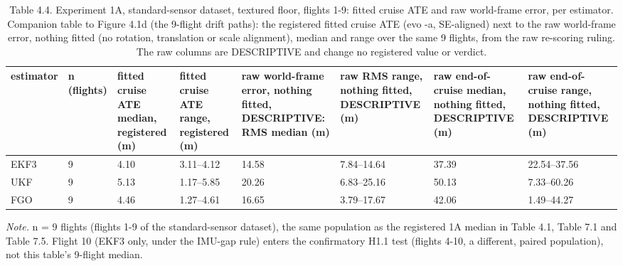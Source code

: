 \begin{table}[htbp]
\centering
\footnotesize
\caption{Table 4.4. Experiment 1A, standard-sensor dataset, textured floor, flights 1-9: fitted cruise ATE and raw world-frame error, per estimator. Companion table to Figure 4.1d (the 9-flight drift paths): the registered fitted cruise ATE (evo -a, SE-aligned) next to the raw world-frame error, nothing fitted (no rotation, translation or scale alignment), median and range over the same 9 flights, from the raw re-scoring ruling. The raw columns are DESCRIPTIVE and change no registered value or verdict.}
\label{tab:4-4}
\begin{tabular}{p{}p{}p{}p{}p{}p{}p{}p{}}
\toprule
\textbf{estimator} & \textbf{n (flights)} & \textbf{fitted cruise ATE median, registered (m)} & \textbf{fitted cruise ATE range, registered (m)} & \textbf{raw world-frame error, nothing fitted, DESCRIPTIVE: RMS median (m)} & \textbf{raw RMS range, nothing fitted, DESCRIPTIVE (m)} & \textbf{raw end-of-cruise median, nothing fitted, DESCRIPTIVE (m)} & \textbf{raw end-of-cruise range, nothing fitted, DESCRIPTIVE (m)} \\
\midrule
EKF3 & 9 & 4.10 & 3.11--4.12 & 14.58 & 7.84--14.64 & 37.39 & 22.54--37.56 \\
UKF & 9 & 5.13 & 1.17--5.85 & 20.26 & 6.83--25.16 & 50.13 & 7.33--60.26 \\
FGO & 9 & 4.46 & 1.27--4.61 & 16.65 & 3.79--17.67 & 42.06 & 1.49--44.27 \\
\bottomrule
\end{tabular}
\par\smallskip\raggedright
\textit{Note.} n = 9 flights (flights 1-9 of the standard-sensor dataset), the same population as the registered 1A median in Table 4.1, Table 7.1 and Table 7.5. Flight 10 (EKF3 only, under the IMU-gap rule) enters the confirmatory H1.1 test (flights 4-10, a different, paired population), not this table's 9-flight median.\par

\end{table}
